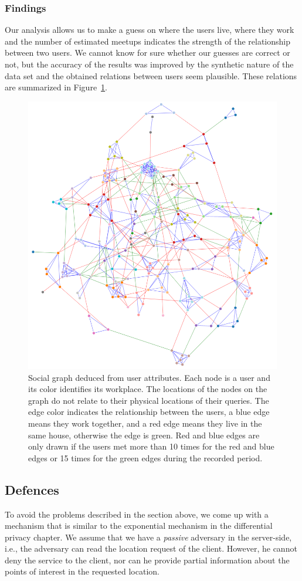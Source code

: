\documentclass[9pt,conference]{IEEEtran}
\begin{document}
\subsubsection{Findings}
Our analysis allows us to make a guess on where the users live, where they work and the number of estimated meetups indicates the strength of the relationship between two users. We cannot know for sure whether our guesses are correct or not, but the accuracy of the results was improved by the synthetic nature of the data set and the obtained relations between users seem plausible. These relations are summarized in Figure~\ref{fig:social-graph}.


\begin{figure}
    \centering
    \includegraphics[width=0.5\linewidth]{images/social_graph.png}
    \caption{Social graph deduced from user attributes. Each node is a user and its color identifies its workplace. The locations of the nodes on the graph do not relate to their physical locations of their queries. The edge color indicates the relationship between the users, a blue edge means they work together, and a red edge means they live in the same house, otherwise the edge is green. Red and blue edges are only drawn if the users met more than 10 times for the red and blue edges or 15 times for the green edges during the recorded period.}
    \label{fig:social-graph}
\end{figure}


\subsection{Defences}

To avoid the problems described in the section above, we come up with a mechanism that is similar to the exponential mechanism in the differential privacy chapter. We assume that we have a \textit{passive} adversary in the server-side, i.e., the adversary can read the location request of the client. However, he cannot deny the service to the client, nor can he provide partial information about the points of interest in the requested location.
\end{document}
